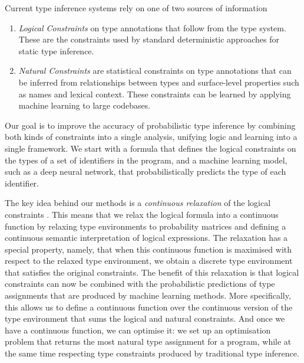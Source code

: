 \documentclass[acmsmall,nonacm]{acmart}\settopmatter{printfolios=true,printccs=false,printacmref=false}
\begin{document}
Current type inference systems rely
on one of two sources of information
\begin{enumerate}[label=(\Roman*)]
	\item \emph{Logical Constraints} on type annotations that follow from the type system.
	      These are the constraints used by standard deterministic approaches for static type inference.
	\item \emph{Natural Constraints} are statistical constraints on type annotations
	      that can be inferred from relationships between types and surface-level properties such as names and lexical context.
	      These constraints can be learned by applying machine learning to large codebases.
\end{enumerate}
Our goal is to improve the accuracy of probabilistic type
inference by combining both kinds of constraints into a single analysis, unifying logic and learning into a single framework.
We start with a formula that defines the logical constraints on the types of a set of identifiers in the program,
and a machine learning model, such as a deep neural network, that probabilistically predicts the type of each identifier.

The key idea behind our methods is a
\emph{continuous relaxation} of
the logical constraints \cite{hajek98}.
This means that we relax the logical formula into a continuous function by relaxing type environments
to probability matrices and defining
a continuous semantic interpretation of logical expressions.
The relaxation has a special property, namely,
that when this continuous function is maximised with respect
to the relaxed type environment, we obtain a discrete type environment
that satisfies the original constraints.
The benefit of this relaxation is that logical constraints
can now be combined with the probabilistic
predictions of type assignments that are
produced by machine learning methods.
More specifically, this allows us to define a continuous function over the continuous version of the type environment
that sums the logical and natural constraints.
And once we have a continuous function, we can optimise it:
we set up an optimisation problem that returns the most natural type assignment for a
program, while at the same time respecting type constraints produced by traditional type inference.
\end{document}
